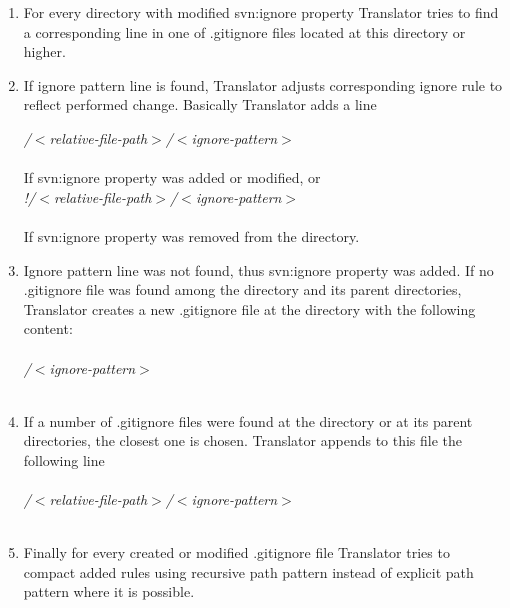 \begin{enumerate}
\compactlist
\item For every directory with modified svn:ignore property Translator tries to find a corresponding line in one of .gitignore files located at this directory or higher.\\
	
\item If ignore pattern line is found, Translator adjusts corresponding ignore rule to reflect performed change. Basically Translator adds a line

\emph{/$<$relative-file-path$>$/$<$ignore-pattern$>$}\\\\

If svn:ignore property was added or modified, or \\

\emph{!/$<$relative-file-path$>$/$<$ignore-pattern$>$}\\\\

If svn:ignore property was removed from the directory.\\
	
\item Ignore pattern line was not found, thus svn:ignore property was added. If no .gitignore file was found among the directory and its parent directories, Translator creates a new .gitignore file at the directory with the following content:\\\\

\emph{/$<$ignore-pattern$>$}\\\\
	
\item If a number of .gitignore files were found at the directory or at its parent directories, the closest one is chosen. Translator appends to this file the following line\\\\

\emph{/$<$relative-file-path$>$/$<$ignore-pattern$>$}\\\\

\item Finally for every created or modified .gitignore file Translator tries to compact added rules using recursive path pattern instead of explicit path pattern where it is possible.
\end{enumerate}

